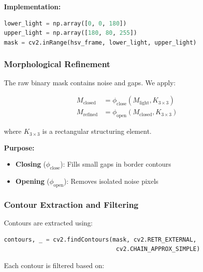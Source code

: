 \documentclass[11pt,a4paper]{article}
\begin{document}
\textbf{Implementation:}
\begin{lstlisting}[language=Python]
lower_light = np.array([0, 0, 180])
upper_light = np.array([180, 80, 255])
mask = cv2.inRange(hsv_frame, lower_light, upper_light)
\end{lstlisting}

\subsubsection{Morphological Refinement}

The raw binary mask contains noise and gaps. We apply:

\begin{align}
M_{\text{closed}} &= \phi_{\text{close}}(M_{\text{light}}, K_{3 \times 3}) \\
M_{\text{refined}} &= \phi_{\text{open}}(M_{\text{closed}}, K_{3 \times 3})
\end{align}

where $K_{3 \times 3}$ is a rectangular structuring element.

\textbf{Purpose:}
\begin{itemize}
    \item \textbf{Closing} ($\phi_{\text{close}}$): Fills small gaps in border contours
    \item \textbf{Opening} ($\phi_{\text{open}}$): Removes isolated noise pixels
\end{itemize}

\subsubsection{Contour Extraction and Filtering}

Contours are extracted using:
\begin{lstlisting}[language=Python]
contours, _ = cv2.findContours(mask, cv2.RETR_EXTERNAL, 
                                cv2.CHAIN_APPROX_SIMPLE)
\end{lstlisting}

Each contour is filtered based on:
\end{document}
